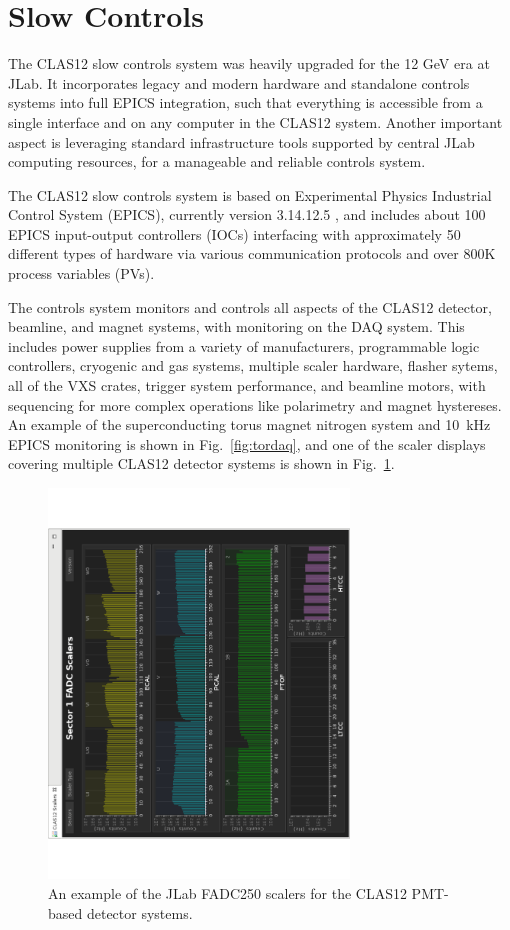 \section{Slow Controls}

The CLAS12 slow controls system was heavily upgraded for the 12 GeV era at JLab.  It incorporates legacy and modern hardware and standalone controls systems into full EPICS integration, such that everything is accessible from a single interface and on any computer in the CLAS12 system.  Another important aspect is leveraging standard infrastructure tools supported by central JLab computing resources, for a manageable and reliable controls system.

The CLAS12 slow controls system is based on Experimental Physics Industrial Control System (EPICS), currently version 3.14.12.5 \cite{epics-website}, and includes about 100 EPICS input-output controllers (IOCs) interfacing with approximately 50 different types of hardware via various communication protocols and over 800K process variables (PVs).

The controls system monitors and controls all aspects of the CLAS12 detector, beamline, and magnet systems, with monitoring on the DAQ system.  This includes power supplies from a variety of manufacturers, programmable logic controllers, cryogenic and gas systems, multiple scaler hardware, flasher sytems, all of the VXS crates, trigger system performance, and beamline motors, with sequencing for more complex operations like polarimetry and magnet hystereses.  An example of the superconducting torus magnet nitrogen system and 10~kHz EPICS monitoring is shown in Fig.~\ref{fig:tordaq}, and one of the scaler displays covering multiple CLAS12 detector systems is shown in Fig.~\ref{fig:jlabscalers}.

\begin{figure}[htbp]\centering
\includegraphics[width=8cm]{img/fd-scalers}
\caption{An example of the JLab FADC250 scalers for the CLAS12 PMT-based detector systems.\label{fig:jlabscalers}}
\end{figure}

